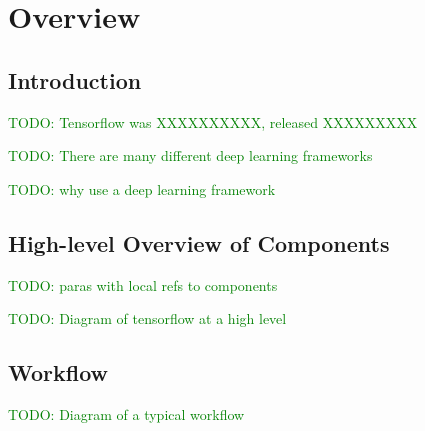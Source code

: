 \chapter{Overview}


\section{Introduction}

\textcolor{green}{TODO: Tensorflow was XXXXXXXXXX, released XXXXXXXXX}

\textcolor{green}{TODO: There are many different deep learning frameworks}

\textcolor{green}{TODO: why use a deep learning framework}

\section{High-level Overview of Components}

\textcolor{green}{TODO: paras with local refs to components}

\textcolor{green}{TODO: Diagram of tensorflow at a high level}

\section{Workflow}

\textcolor{green}{TODO: Diagram of a typical workflow}